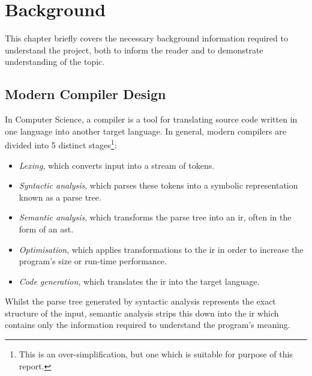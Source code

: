 \documentclass[bsc,twoside,singlespacing,parskip,logo,notimes,normalheadings]{infthesis}
\begin{document}
\chapter{Background}\label{chap:background}
\vspace{-8mm}
This chapter briefly covers the necessary background information
required to understand the project, both to inform the reader and to
demonstrate understanding of the topic.
\vspace{-2mm}
    \section{Modern Compiler Design}
    In Computer Science, a compiler is a tool for translating source
    code written in one language into another target language. In
    general, modern compilers are divided into 5 distinct
    stages\footnote{ This is an over-simplification, but one which is
      suitable for purpose of this report.}:

    \begin{itemize}
    \item {\em Lexing}, which converts input into a stream of tokens.
    \item {\em Syntactic analysis}, which parses these tokens into
      a symbolic representation known as a parse tree.
    \item {\em Semantic analysis}, which transforms the parse tree
      into an \gls{ir}, often in the form of an \gls{ast}.
    \item {\em Optimisation}, which applies transformations to the
      \gls{ir} in order to increase the program's size or run-time
      performance.
    \item {\em Code generation}, which translates the \gls{ir} into
      the target language.
    \end{itemize}

    Whilst the parse tree generated by syntactic analysis represents
    the exact structure of the input, semantic analysis strips this
    down into the \gls{ir} which contains only the information
    required to understand the program's meaning.
\end{document}
